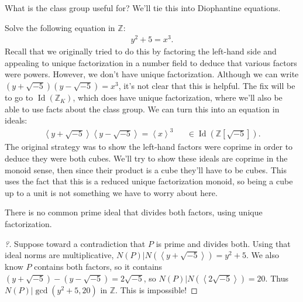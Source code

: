 \begin{remark}

What is the class group useful for? We'll tie this into Diophantine
equations.

\end{remark}

\begin{example}[?]

Solve the following equation in \({\mathbb{Z}}\):
\begin{align*}
y^2 + 5 = x^3
.\end{align*}
Recall that we originally tried to do this by factoring the left-hand
side and appealing to unique factorization in a number field to deduce
that various factors were powers. However, we don't have unique
factorization. Although we can write
\(( y + \sqrt{-5} ) (y - \sqrt{-5} ) = x^3\), it's not clear that this
is helpful. The fix will be to go to
\(\operatorname{Id}({\mathbb{Z}}_K)\), which does have unique
factorization, where we'll also be able to use facts about the class
group. We can turn this into an equation in ideals:
\begin{align*}
\left\langle{ y + \sqrt{-5} }\right\rangle  
\left\langle{ y - \sqrt{-5} }\right\rangle  
= 
\left\langle{ x }\right\rangle^3 && \in \operatorname{Id}({\mathbb{Z}}[\sqrt{-5} ]) 
.\end{align*}
The original strategy was to show the left-hand factors were coprime in
order to deduce they were both cubes. We'll try to show these ideals are
coprime in the monoid sense, then since their product is a cube they'll
have to be cubes. This uses the fact that this is a reduced unique
factorization monoid, so being a cube up to a unit is not something we
have to worry about here.

\begin{claim}

There is no common prime ideal that divides both factors, using unique
factorization.

\end{claim}

\begin{proof}[?]

Suppose toward a contradiction that \(P\) is prime and divides both.
Using that ideal norms are multiplicative,
\(N(P) \mathrel{\Big|}N( \left\langle{ y + \sqrt{-5} }\right\rangle) = y^2 + 5\).
We also know \(P\) contains both factors, so it contains
\((y + \sqrt{-5} ) - (y - \sqrt{-5} ) = 2 \sqrt{-5}\), so
\(N(P) \mathrel{\Big|}N( \left\langle{ 2 \sqrt{-5} }\right\rangle ) = 20\).
Thus \(N(P) \mathrel{\Big|}\gcd(y^2 + 5, 20)\) in \({\mathbb{Z}}\). This
is impossible!


\end{proof}
\end{example}
